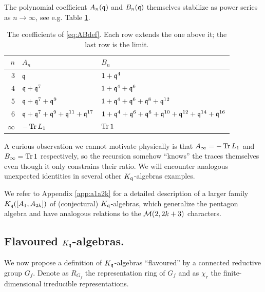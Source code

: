 \documentclass[12pt]{amsart}
\begin{document}
The polynomial coefficient $A_n(\mathfrak{q})$ and $B_n(\mathfrak{q})$ themselves stabilize as power series as $n \to \infty$, see e.g. Table \ref{tab:pentagon-stabilization}. \begin{table}[t]
  \centering
  \renewcommand{\arraystretch}{1.35}
  \caption{The coefficients of \eqref{eq:ABdef}.  Each row extends the one
    above it; the last row is the limit.}
  \label{tab:pentagon-stabilization}
  \begin{tabular}{@{}r@{\qquad}l@{\qquad}l@{}}
    \toprule
    $n$ & $A_n$ & $B_n$ \\
    \midrule
    $3$ & $\mathfrak{q}$                                   & $1+\mathfrak{q}^{4}$ \\
    $4$ & $\mathfrak{q}+\mathfrak{q}^{7}$                           & $1+\mathfrak{q}^{4}+\mathfrak{q}^{6}$ \\
    $5$ & $\mathfrak{q}+\mathfrak{q}^{7}+\mathfrak{q}^{9}$                   & $1+\mathfrak{q}^{4}+\mathfrak{q}^{6}+\mathfrak{q}^{8}+\mathfrak{q}^{12}$ \\
    $6$ & $\mathfrak{q}+\mathfrak{q}^{7}+\mathfrak{q}^{9}+\mathfrak{q}^{11}+\mathfrak{q}^{17}$ & $1+\mathfrak{q}^{4}+\mathfrak{q}^{6}+\mathfrak{q}^{8}+\mathfrak{q}^{10}+\mathfrak{q}^{12}+\mathfrak{q}^{14}+\mathfrak{q}^{16}$ \\
    \midrule
    $\infty$ & $-\operatorname{Tr} L_1$                         & $\operatorname{Tr} 1$ \\
    \bottomrule
  \end{tabular}
\end{table}
\begin{remark}
\label{rem:miracle}
A curious observation we cannot motivate physically is that $A_\infty = -\operatorname{Tr} L_1$ and $B_\infty = \operatorname{Tr} 1$ respectively, 
so the recursion somehow ``knows'' the traces themselves even though it only constrains their ratio. We will encounter analogous unexpected identities in several other $K_{\mathfrak{q}}$-algebras examples.
\end{remark}
We refer to Appendix \ref{app:a1a2k} for a detailed description of a larger family $K_{\mathfrak{q}}([A_1,A_{2k}])$ of (conjectural) $K_{\mathfrak{q}}$-algebras, which generalize the pentagon algebra and have analogous relations to the ${\mathcal M}(2,2k+3)$ characters.

\subsection{Flavoured $K_{\mathfrak{q}}$-algebras.}
\label{sec:flavoured}
We now propose a definition of $K_{\mathfrak{q}}$-algebras ``flavoured'' by a connected reductive group $G_f$. Denote as $R_{G_f}$ the representation ring of $G_f$ and as $\chi_r$ the finite-dimensional irreducible representations.
\end{document}

